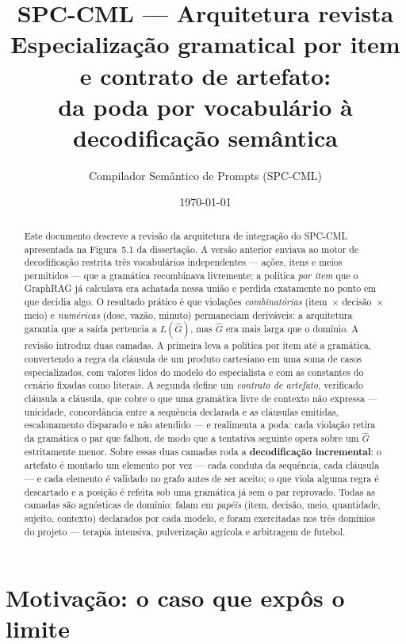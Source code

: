 \documentclass[11pt,a4paper]{article}
\title{\textbf{SPC-CML — Arquitetura revista}\\[2mm]
\large Especialização gramatical por item e contrato de artefato:\\
da poda por vocabulário à decodificação semântica}
\author{Compilador Semântico de Prompts (SPC-CML)}
\date{\today}
\begin{document}
\maketitle

\begin{abstract}
\noindent
Este documento descreve a revisão da arquitetura de integração do SPC-CML
apresentada na Figura~5.1 da dissertação. A versão anterior enviava ao motor de
decodificação restrita três vocabulários independentes --- ações, itens e meios
permitidos --- que a gramática recombinava livremente; a política \emph{por item}
que o GraphRAG já calculava era achatada nessa união e perdida exatamente no
ponto em que decidia algo. O resultado prático é que violações
\emph{combinatórias} (item~$\times$ decisão~$\times$ meio) e \emph{numéricas}
(dose, vazão, minuto) permaneciam deriváveis: a arquitetura garantia que a saída
pertencia a $L(\hat{G})$, mas $\hat{G}$ era mais larga que o domínio.
A revisão introduz duas camadas. A primeira leva a política por item até a
gramática, convertendo a regra da cláusula de um produto cartesiano em uma soma
de casos especializados, com valores lidos do modelo do especialista e com as
constantes do cenário fixadas como literais. A segunda define um
\emph{contrato de artefato}, verificado cláusula a cláusula, que cobre o que uma
gramática livre de contexto não expressa --- unicidade, concordância entre a
sequência declarada e as cláusulas emitidas, escalonamento disparado e não
atendido --- e realimenta a poda: cada violação retira da gramática o par que
falhou, de modo que a tentativa seguinte opera sobre um $\hat{G}$ estritamente
menor. Sobre essas duas camadas roda a \textbf{decodificação incremental}: o
artefato é montado um elemento por vez --- cada conduta da sequência, cada
cláusula --- e cada elemento é validado no grafo antes de ser aceito; o que
viola alguma regra é descartado e a posição é refeita sob uma gramática já sem o
par reprovado. Todas as camadas são agnósticas de domínio: falam em
\emph{papéis} (item, decisão, meio, quantidade, sujeito, contexto) declarados por
cada modelo, e foram exercitadas nos três domínios do projeto --- terapia
intensiva, pulverização agrícola e arbitragem de futebol.
\end{abstract}

\tableofcontents
\newpage

\section{Motivação: o caso que expôs o limite}
\end{document}
